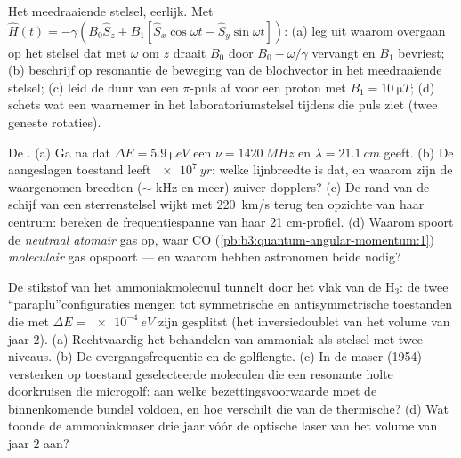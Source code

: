 \begin{exercise}[$\star\star$]\label{exo:b3:spin-two-level:7}
Het meedraaiende stelsel, eerlijk. Met $\hat H(t) = -\gamma(B_0\hat S_z
+ B_1[\hat S_x\cos\omega t - \hat S_y\sin\omega t])$: (a) leg uit waarom
overgaan op het stelsel dat met $\omega$ om $z$ draait $B_0$ door $B_0 - \omega/\gamma$ vervangt en $B_1$ bevriest; (b) beschrijf op resonantie de
beweging van de blochvector in het meedraaiende stelsel; (c) leid de duur
van een $\pi$-puls af voor een proton met $B_1 =
\qty{10}{\micro T}$; (d)
schets wat een waarnemer in het laboratoriumstelsel tijdens die puls ziet
(twee geneste rotaties).
\end{exercise}

\begin{exercise}[$\star\star$]\label{exo:b3:spin-two-level:8}
De . (a) Ga na dat $\Delta E = \qty{5.9}{\micro eV}$ een $\nu = \qty{1420}{MHz}$ en $\lambda = \qty{21.1}{cm}$ geeft. (b) De aangeslagen
toestand leeft $\qty{e7}{yr}$: welke lijnbreedte is dat, en waarom zijn de
waargenomen breedten ($\sim$ kHz en meer) zuiver dopplers? (c) De rand van
de schijf van een sterrenstelsel wijkt met \qty{220}{km/s} terug ten
opzichte van haar centrum: bereken de frequentiespanne van haar
21 cm-profiel. (d) Waarom spoort de  \emph{neutraal atomair} gas
op, waar CO (\cref{pb:b3:quantum-angular-momentum:1}) \emph{moleculair}
gas opspoort --- en waarom hebben astronomen beide nodig?
\end{exercise}

\begin{exercise}[$\star\star$]\label{exo:b3:spin-two-level:9}
De stikstof van het ammoniakmolecuul tunnelt door het vlak van de H$_3$:
de twee ``paraplu''configuraties mengen tot symmetrische en
antisymmetrische toestanden die met $\Delta E = \qty{e-4}{eV}$ zijn
gesplitst (het inversiedoublet van het volume van jaar 2). (a)
Rechtvaardig het behandelen van ammoniak als stelsel met twee niveaus. (b)
De overgangsfrequentie en de golflengte. (c) In de maser (1954)
versterken op toestand geselecteerde moleculen die een resonante holte
doorkruisen die microgolf: aan welke bezettingsvoorwaarde moet de
binnenkomende bundel voldoen, en hoe verschilt die van de thermische? (d)
Wat toonde de ammoniakmaser drie jaar vóór de optische laser van het
volume van jaar 2 aan?
\end{exercise}

